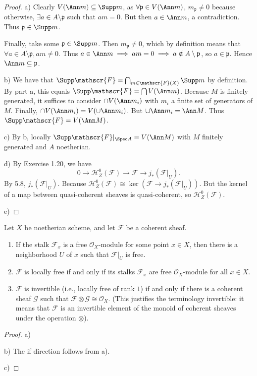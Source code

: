 \begin{proof}
	a) 
	Clearly $V(\Ann m) \subseteq \Supp m$, as $\forall \mathfrak{p} \in V(\Ann m) $, $m_{\mathfrak{p}} \ne 0 $ because otherwise, $\exists a \in A\setminus \mathfrak{p} $ such that $am = 0 $.
	But then $a \in \Ann m $, a contradiction.
	Thus $\mathfrak{p} \in \Supp m $.

	Finally, take some $\mathfrak{p} \in \Supp m $.
	Then $m_{\mathfrak{p}} \ne 0 $, which by definition means that $\forall a \in A\setminus \mathfrak{p}, am \ne 0 $.
	Thus $a \in \Ann m \implies am = 0 \implies a \notin A \setminus \mathfrak{p} $, so $a \in \mathfrak{p} $.
	Hence $\Ann m \subseteq \mathfrak{p} $.

	b) We have that $\Supp \mathscr{F} = \bigcap_{m \in \mathscr{F}(X)} \Supp m $ by definition.
	By part a, this equals $\Supp \mathscr{F} = \bigcap V(\Ann m) $.
	Because $M $ is finitely generated, it suffices to consider $\cap V(\Ann m_i) $ with $m_i $ a finite set of generators of $M $.
	Finally, $\cap V(\Ann m_i) = V(\cup \Ann m_i) $.
	But $\cup \Ann m_i = \Ann M $.
	Thus $\Supp \mathscr{F} = V(\Ann M) $.

	c) By b, locally $\Supp \mathscr{F}|_{\Spec A} = V(\Ann M)$ with $M $ finitely generated and $A $ noetherian.

	d) By Exercise 1.20, we have
	\[
		0 \to \mathscr{H}_Z^0(\mathscr{F}) \to \mathscr{F} \to j_\ast(\mathscr{F}|_U)
	.\] 
	By 5.8, $j_\ast(\mathscr{F}|_U) $.
	Because $\mathscr{H}_{Z}^0(\mathscr{F}) \cong \ker(\mathscr{F}\to j_\ast(\mathscr{F}|_U)) $.
	But the kernel of a map between quasi-coherent sheaves is quasi-coherent, so $\mathscr{H}_Z^0(\mathscr{F}) $.

	e) 
\end{proof}

\begin{exercise}%
	Let $X $ be noetherian scheme, and let $\mathscr{F} $ be a coherent sheaf.
	\begin{enumerate}
		\item If the stalk $\mathscr{F}_x $ is a free $\mathcal{O}_X $-module for some point $x\in X $, then there is a neighborhood $U $ of $x $ such that $\mathscr{F}|_U $ is free.
		\item $\mathscr{F} $ is locally free if and only if its stalks $\mathscr{F}_x $ are free $\mathcal{O}_X $-module for all $x \in X $.
		\item $\mathscr{F} $ is invertible (i.e., locally free of rank $1 $) if and only if there is a coherent sheaf $\mathscr{G} $ such that $\mathscr{F} \otimes \mathscr{G} \cong \mathcal{O}_X $. (This justifies the terminology invertible: it means that $\mathscr{F} $ is an invertible element of the monoid of coherent sheaves under the operation $\otimes $).
	\end{enumerate}
\end{exercise}
\begin{proof}
	a) 

	b) The if direction follows from a).

	c)
\end{proof}

